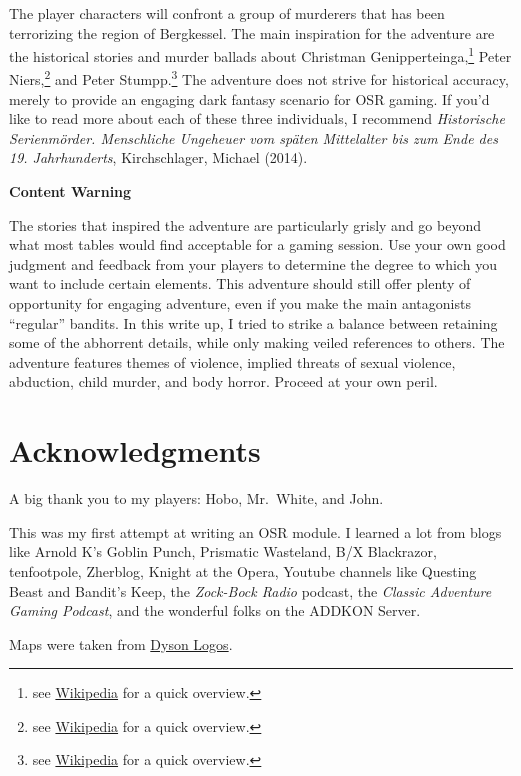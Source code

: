\documentclass[
]{book}
\begin{document}
The player characters will confront a group of murderers that has been terrorizing the region of Bergkessel. The main inspiration for the adventure are the historical stories and murder ballads about Christman Genipperteinga,\footnote{see \href{https://en.wikipedia.org/wiki/Christman_Genipperteinga}{Wikipedia} for a quick overview.} Peter Niers,\footnote{see \href{https://en.wikipedia.org/wiki/Peter_Niers}{Wikipedia} for a quick overview.} and Peter Stumpp.\footnote{see \href{https://en.wikipedia.org/wiki/Peter_Stumpp}{Wikipedia} for a quick overview.} The adventure does not strive for historical accuracy, merely to provide an engaging dark fantasy scenario for OSR gaming. If you'd like to read more about each of these three individuals, I recommend \emph{Historische Serienmörder. Menschliche Ungeheuer vom späten Mittelalter bis zum Ende des 19. Jahrhunderts}, Kirchschlager, Michael (2014).

\textbf{Content Warning}

The stories that inspired the adventure are particularly grisly and go beyond what most tables would find acceptable for a gaming session. Use your own good judgment and feedback from your players to determine the degree to which you want to include certain elements. This adventure should still offer plenty of opportunity for engaging adventure, even if you make the main antagonists ``regular'' bandits. In this write up, I tried to strike a balance between retaining some of the abhorrent details, while only making veiled references to others. The adventure features themes of violence, implied threats of sexual violence, abduction, child murder, and body horror. Proceed at your own peril.

\chapter*{Acknowledgments}\label{acknowledgments}

A big thank you to my players: Hobo, Mr.~White, and John.

This was my first attempt at writing an OSR module. I learned a lot from blogs like Arnold K's Goblin Punch, Prismatic Wasteland, B/X Blackrazor, tenfootpole, Zherblog, Knight at the Opera, Youtube channels like Questing Beast and Bandit's Keep, the \emph{Zock-Bock Radio} podcast, the \emph{Classic Adventure Gaming Podcast}, and the wonderful folks on the ADDKON Server.

Maps were taken from \href{https://dysonlogos.blog/}{Dyson Logos}.
\end{document}
